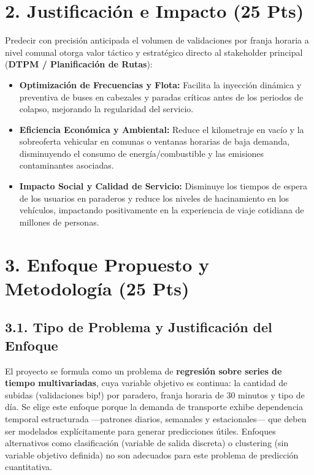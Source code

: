 \documentclass[11pt,letterpaper]{article}
\begin{document}
\section*{\color{primary}2. Justificación e Impacto (25 Pts)}
Predecir con precisión anticipada el volumen de validaciones por franja horaria a nivel comunal otorga valor táctico y estratégico directo al stakeholder principal (\textbf{DTPM / Planificación de Rutas}):
\begin{itemize}
    \item \textbf{Optimización de Frecuencias y Flota:} Facilita la inyección dinámica y preventiva de buses en cabezales y paradas críticas antes de los periodos de colapso, mejorando la regularidad del servicio.
    \item \textbf{Eficiencia Económica y Ambiental:} Reduce el kilometraje en vacío y la sobreoferta vehicular en comunas o ventanas horarias de baja demanda, disminuyendo el consumo de energía/combustible y las emisiones contaminantes asociadas.
    \item \textbf{Impacto Social y Calidad de Servicio:} Disminuye los tiempos de espera de los usuarios en paraderos y reduce los niveles de hacinamiento en los vehículos, impactando positivamente en la experiencia de viaje cotidiana de millones de personas.
\end{itemize}

\section*{\color{primary}3. Enfoque Propuesto y Metodología (25 Pts)}

\subsection*{3.1. Tipo de Problema y Justificación del Enfoque}
El proyecto se formula como un problema de \textbf{regresión sobre series de tiempo multivariadas}, cuya variable objetivo es continua: la cantidad de subidas (validaciones bip!) por paradero, franja horaria de 30 minutos y tipo de día. Se elige este enfoque porque la demanda de transporte exhibe dependencia temporal estructurada —patrones diarios, semanales y estacionales— que deben ser modelados explícitamente para generar predicciones útiles. Enfoques alternativos como clasificación (variable de salida discreta) o clustering (sin variable objetivo definida) no son adecuados para este problema de predicción cuantitativa.
\end{document}
